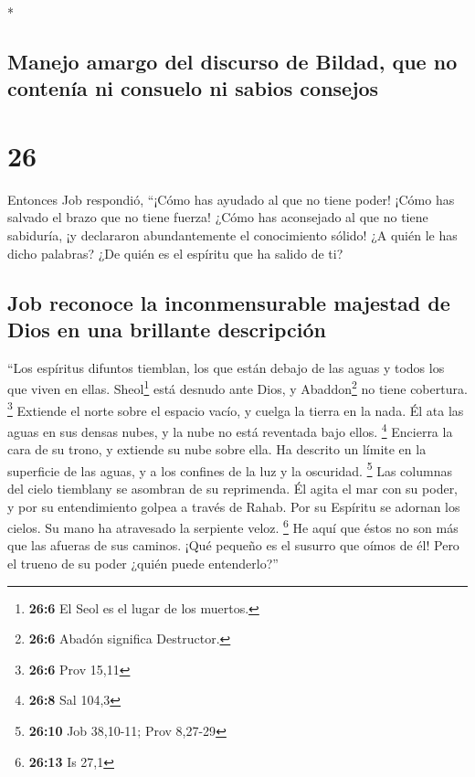 \begin{paracol}{2}
\begin{otherlanguage}{english}
\end{otherlanguage}

\switchcolumn[0]*

\hypertarget{manejo-amargo-del-discurso-de-bildad-que-no-contenuxeda-ni-consuelo-ni-sabios-consejos}{%
\subsection{Manejo amargo del discurso de Bildad, que no contenía ni
consuelo ni sabios
consejos}\label{manejo-amargo-del-discurso-de-bildad-que-no-contenuxeda-ni-consuelo-ni-sabios-consejos}}

\hypertarget{section-50}{%
\section{26}\label{section-50}}

 Entonces Job respondió,  ``¡Cómo has
ayudado al que no tiene poder! ¡Cómo has salvado el brazo que no tiene
fuerza!  ¿Cómo has aconsejado al que no tiene sabiduría,
¡y declararon abundantemente el conocimiento sólido!  ¿A
quién le has dicho palabras? ¿De quién es el espíritu que ha salido de
ti?

\hypertarget{job-reconoce-la-inconmensurable-majestad-de-dios-en-una-brillante-descripciuxf3n}{%
\subsection{Job reconoce la inconmensurable majestad de Dios en una
brillante
descripción}\label{job-reconoce-la-inconmensurable-majestad-de-dios-en-una-brillante-descripciuxf3n}}

 ``Los espíritus difuntos tiemblan, los que están debajo
de las aguas y todos los que viven en ellas. 
Sheol\footnote{\textbf{26:6} El Seol es el lugar de los muertos.} está
desnudo ante Dios, y Abaddon\footnote{\textbf{26:6} Abadón significa
  Destructor.} no tiene cobertura. \footnote{\textbf{26:6} Prov 15,11}
 Extiende el norte sobre el espacio vacío, y cuelga la
tierra en la nada.  Él ata las aguas en sus densas nubes,
y la nube no está reventada bajo ellos. \footnote{\textbf{26:8} Sal
  104,3}  Encierra la cara de su trono, y extiende su nube
sobre ella.  Ha descrito un límite en la superficie de
las aguas, y a los confines de la luz y la oscuridad. \footnote{\textbf{26:10}
  Job 38,10-11; Prov 8,27-29}  Las columnas del cielo
tiemblany se asombran de su reprimenda.  Él agita el mar
con su poder, y por su entendimiento golpea a través de Rahab.
 Por su Espíritu se adornan los cielos. Su mano ha
atravesado la serpiente veloz. \footnote{\textbf{26:13} Is 27,1}
 He aquí que éstos no son más que las afueras de sus
caminos. ¡Qué pequeño es el susurro que oímos de él! Pero el trueno de
su poder ¿quién puede entenderlo?''


\end{paracol}
